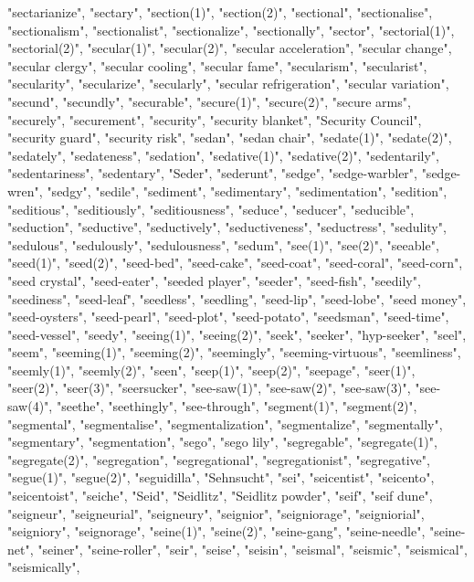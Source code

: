 "sectarianize",
"sectary",
"section(1)",
"section(2)",
"sectional",
"sectionalise",
"sectionalism",
"sectionalist",
"sectionalize",
"sectionally",
"sector",
"sectorial(1)",
"sectorial(2)",
"secular(1)",
"secular(2)",
"secular acceleration",
"secular change",
"secular clergy",
"secular cooling",
"secular fame",
"secularism",
"secularist",
"secularity",
"secularize",
"secularly",
"secular refrigeration",
"secular variation",
"secund",
"secundly",
"securable",
"secure(1)",
"secure(2)",
"secure arms",
"securely",
"securement",
"security",
"security blanket",
"Security Council",
"security guard",
"security risk",
"sedan",
"sedan chair",
"sedate(1)",
"sedate(2)",
"sedately",
"sedateness",
"sedation",
"sedative(1)",
"sedative(2)",
"sedentarily",
"sedentariness",
"sedentary",
"Seder",
"sederunt",
"sedge",
"sedge-warbler",
"sedge-wren",
"sedgy",
"sedile",
"sediment",
"sedimentary",
"sedimentation",
"sedition",
"seditious",
"seditiously",
"seditiousness",
"seduce",
"seducer",
"seducible",
"seduction",
"seductive",
"seductively",
"seductiveness",
"seductress",
"sedulity",
"sedulous",
"sedulously",
"sedulousness",
"sedum",
"see(1)",
"see(2)",
"seeable",
"seed(1)",
"seed(2)",
"seed-bed",
"seed-cake",
"seed-coat",
"seed-coral",
"seed-corn",
"seed crystal",
"seed-eater",
"seeded player",
"seeder",
"seed-fish",
"seedily",
"seediness",
"seed-leaf",
"seedless",
"seedling",
"seed-lip",
"seed-lobe",
"seed money",
"seed-oysters",
"seed-pearl",
"seed-plot",
"seed-potato",
"seedsman",
"seed-time",
"seed-vessel",
"seedy",
"seeing(1)",
"seeing(2)",
"seek",
"seeker",
"hyp-seeker",
"seel",
"seem",
"seeming(1)",
"seeming(2)",
"seemingly",
"seeming-virtuous",
"seemliness",
"seemly(1)",
"seemly(2)",
"seen",
"seep(1)",
"seep(2)",
"seepage",
"seer(1)",
"seer(2)",
"seer(3)",
"seersucker",
"see-saw(1)",
"see-saw(2)",
"see-saw(3)",
"see-saw(4)",
"seethe",
"seethingly",
"see-through",
"segment(1)",
"segment(2)",
"segmental",
"segmentalise",
"segmentalization",
"segmentalize",
"segmentally",
"segmentary",
"segmentation",
"sego",
"sego lily",
"segregable",
"segregate(1)",
"segregate(2)",
"segregation",
"segregational",
"segregationist",
"segregative",
"segue(1)",
"segue(2)",
"seguidilla",
"Sehnsucht",
"sei",
"seicentist",
"seicento",
"seicentoist",
"seiche",
"Seid",
"Seidlitz",
"Seidlitz powder",
"seif",
"seif dune",
"seigneur",
"seigneurial",
"seigneury",
"seignior",
"seigniorage",
"seigniorial",
"seigniory",
"seignorage",
"seine(1)",
"seine(2)",
"seine-gang",
"seine-needle",
"seine-net",
"seiner",
"seine-roller",
"seir",
"seise",
"seisin",
"seismal",
"seismic",
"seismical",
"seismically",
